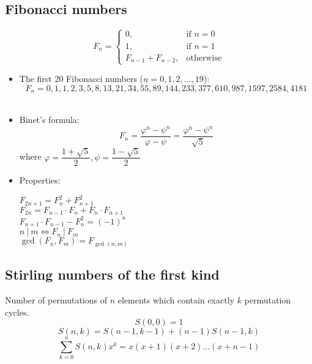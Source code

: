 \subsection{Fibonacci numbers}
\[ F_{n} =
  \begin{cases}
    0, & \text{if } n = 0 \\
    1, & \text{if } n = 1 \\
    F_{n - 1} + F_{n - 2}, & \text{otherwise}
  \end{cases}
\]
\begin{itemize}[leftmargin=*]
  \item The first 20 Fibonacci numbers ($n = 0, 1, 2, \ldots, 19$):
    \[ F_n = 0, 1, 1, 2, 3, 5, 8, 13, 21, 34, 55, 89, 144, 233, 377, 610, 987, 1597, 2584, 4181 \]\
  \item Binet's formula:
    \[F_n = \frac{\varphi^n - \psi^n}{\varphi - \psi} = \frac{\varphi^n - \psi^n}{\sqrt{5}}\]
    where $\varphi = \dfrac{1 + \sqrt{5}}{2}, \psi = \dfrac{1 - \sqrt{5}}{2}$
  \item Properties:
  \begin{multicols*}{2}
    $F_{2n + 1} = F_{n}^2 + F_{n + 1}^2$ \\
    $F_{2n} = F_{n - 1} \cdot F_{n} + F_{n} \cdot F_{n + 1}$ \\
    $F_{n + 1} \cdot F_{n - 1} - F_{n}^2 = (-1)^{n}$ \\
    $n\ |\ m \Leftrightarrow F_{n}\ |\ F_{m}$ \\
    $\gcd(F_{n}, F_{m}) = F_{\gcd(n, m)}$
  \end{multicols*}
\end{itemize}

\subsection{Stirling numbers of the first kind}
Number of permutations of $n$ elements which contain exactly $k$ permutation cycles.
\[S(0, 0) = 1\]
\[S(n, k) = S(n - 1, k - 1) + (n - 1)S(n - 1, k)\]
\[\sum\limits_{k = 0}^{n}{S(n, k)x^k = x(x + 1)(x + 2)\ldots(x + n - 1)}\]

